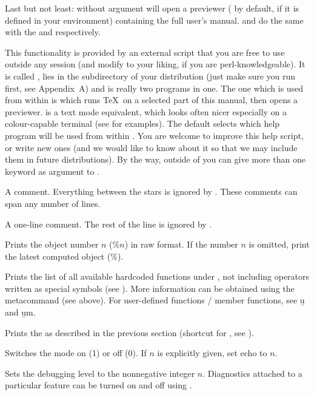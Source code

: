 Last but not least:  without argument will open a 
previewer ( by default,  if it is defined in your
environment) containing the full user's manual.  and
 do the same with the  and 
respectively.

 This functionality is provided by an
external  script that you are free to use outside any  session
(and modify to your liking, if you are perl-knowledgeable). It is called
, lies in the  subdirectory of your distribution
(just make sure you run  first, see Appendix~A) and is
really two programs in one. The one which is used from within  is
 which runs \TeX\ on a selected part of this manual, then opens
a previewer.  is a text mode equivalent, which looks
often nicer especially on a colour-capable terminal (see
 for examples). The default  selects which
help program will be used from within . You are welcome to improve this
help script, or write new ones (and we would like to know about it
so that we may include them in future distributions). By the way, outside
of  you can give more than one keyword as argument to .

 A comment. Everything between the stars is ignored by
. These comments can span any number of lines.

\subseckbd{\bs\bs} A one-line comment. The rest of the line
is ignored by .

 Prints the object number $n$ ($\%n$)
in raw format. If the number $n$ is omitted, print the latest computed object
($\%$). \label{se:history}

 Prints the list of all available
hardcoded functions under , not including operators written as special
symbols (see ). More information can be obtained using
the  metacommand (see above). For user-defined functions / member
functions, see \b{u} and \b{um}.

 Prints the  as described in the
previous section (shortcut for , see ).

 Switches the  mode on (1) or off (0). If
$n$ is explicitly given, set echo to $n$.

 Sets the debugging level  to the
nonnegative integer $n$. Diagnostics attached to a particular feature can be
turned on and off using .

